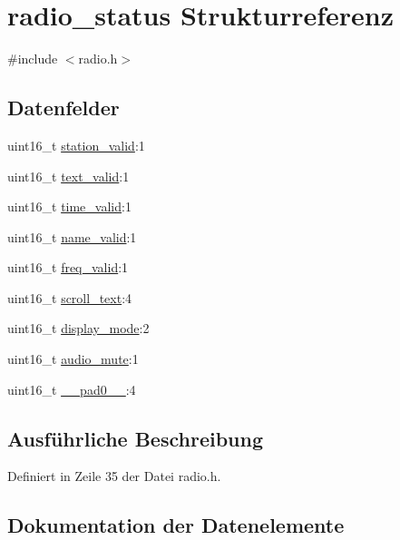 \hypertarget{structradio__status}{}\section{radio\+\_\+status Strukturreferenz}
\label{structradio__status}


{\ttfamily \#include $<$radio.\+h$>$}

\subsection*{Datenfelder}
\begin{DoxyCompactItemize}
\item 
uint16\+\_\+t \hyperlink{structradio__status_a5b532af663903e8196d7781d3f6767e3}{station\+\_\+valid}\+:1
\item 
uint16\+\_\+t \hyperlink{structradio__status_aa4b556b7564cd5016a39e2a5c3aab1b9}{text\+\_\+valid}\+:1
\item 
uint16\+\_\+t \hyperlink{structradio__status_a3d873f4f8e8dd5c6dcc0c930a44c3449}{time\+\_\+valid}\+:1
\item 
uint16\+\_\+t \hyperlink{structradio__status_a842d6e1b68c63972c4c4e968b1cb3ecc}{name\+\_\+valid}\+:1
\item 
uint16\+\_\+t \hyperlink{structradio__status_a978bf90e15e81e6bd50889aa0df2c7ce}{freq\+\_\+valid}\+:1
\item 
uint16\+\_\+t \hyperlink{structradio__status_aac214d01bdfc63d8cc9c8ec2e870068b}{scroll\+\_\+text}\+:4
\item 
uint16\+\_\+t \hyperlink{structradio__status_a2adcc7027dfa4863cdf990071f08a141}{display\+\_\+mode}\+:2
\item 
uint16\+\_\+t \hyperlink{structradio__status_a89c0ce618dc30ac07daea694a9ec664e}{audio\+\_\+mute}\+:1
\item 
uint16\+\_\+t \hyperlink{structradio__status_a77132c2c26a75f5b8751b235cda23828}{\+\_\+\+\_\+pad0\+\_\+\+\_\+}\+:4
\end{DoxyCompactItemize}


\subsection{Ausführliche Beschreibung}


Definiert in Zeile 35 der Datei radio.\+h.



\subsection{Dokumentation der Datenelemente}
\hypertarget{structradio__status_a77132c2c26a75f5b8751b235cda23828}{}

